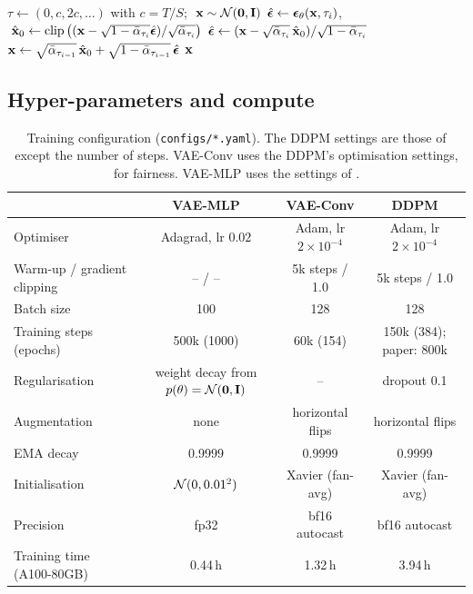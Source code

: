 \begin{algorithm}[H]
\caption{DDIM sampling~\citep{song2021ddim} ($\eta=0$, $S$ steps, same trained network)}
\label{alg:ddim}
\begin{algorithmic}[1]
\State $\tau \gets (0, c, 2c, \dots)$ with $c=T/S$; $\;\mathbf{x}\sim\mathcal{N}(\mathbf{0},\mathbf{I})$
  \State $\hat{\bm{\epsilon}} \gets \bm{\epsilon}_\theta(\mathbf{x},\tau_i)$, $\;\hat{\mathbf{x}}_0\gets\operatorname{clip}\big((\mathbf{x}-\sqrt{1-\bar{\alpha}_{\tau_i}}\hat{\bm{\epsilon}})/\sqrt{\bar{\alpha}_{\tau_i}}\big)$
  \State $\hat{\bm{\epsilon}} \gets (\mathbf{x}-\sqrt{\bar{\alpha}_{\tau_i}}\,\hat{\mathbf{x}}_0)/\sqrt{1-\bar{\alpha}_{\tau_i}}$ 
  \State $\mathbf{x} \gets \sqrt{\bar{\alpha}_{\tau_{i-1}}}\,\hat{\mathbf{x}}_0 + \sqrt{1-\bar{\alpha}_{\tau_{i-1}}}\,\hat{\bm{\epsilon}}$ 
\EndFor
\State \Return $\mathbf{x}$
\end{algorithmic}
\end{algorithm}

\subsection{Hyper-parameters and compute}

\begin{table}[H]
\centering\small
\caption{Training configuration (\texttt{configs/*.yaml}). The DDPM settings are those of \citet{ho2020ddpm}
except the number of steps. VAE-Conv uses the DDPM's optimisation settings, for fairness. VAE-MLP uses the
settings of \citet{kingma2014vae}.}
\label{tab:hparams}
\footnotesize
\begin{tabular}{@{}lccc@{}}
\toprule
 & \textbf{VAE-MLP} & \textbf{VAE-Conv} & \textbf{DDPM}\\
\midrule
Optimiser & Adagrad, lr $0.02$ & Adam, lr $2\!\times\!10^{-4}$ & Adam, lr $2\!\times\!10^{-4}$\\
Warm-up / gradient clipping & -- / -- & 5k steps / 1.0 & 5k steps / 1.0\\
Batch size & 100 & 128 & 128\\
Training steps (epochs) & 500k (1000) & 60k (154) & 150k (384); paper: 800k\\
Regularisation & weight decay from $p(\theta)=\mathcal{N}(\mathbf{0},\mathbf{I})$ & -- & dropout 0.1\\
Augmentation & none & horizontal flips & horizontal flips\\
EMA decay & 0.9999 & 0.9999 & 0.9999\\
Initialisation & $\mathcal{N}(0,0.01^2)$ & Xavier (fan-avg) & Xavier (fan-avg)\\
Precision & fp32 & bf16 autocast & bf16 autocast\\
Training time (A100-80GB) & 0.44\,h & 1.32\,h & 3.94\,h\\
\bottomrule
\end{tabular}
\end{table}

